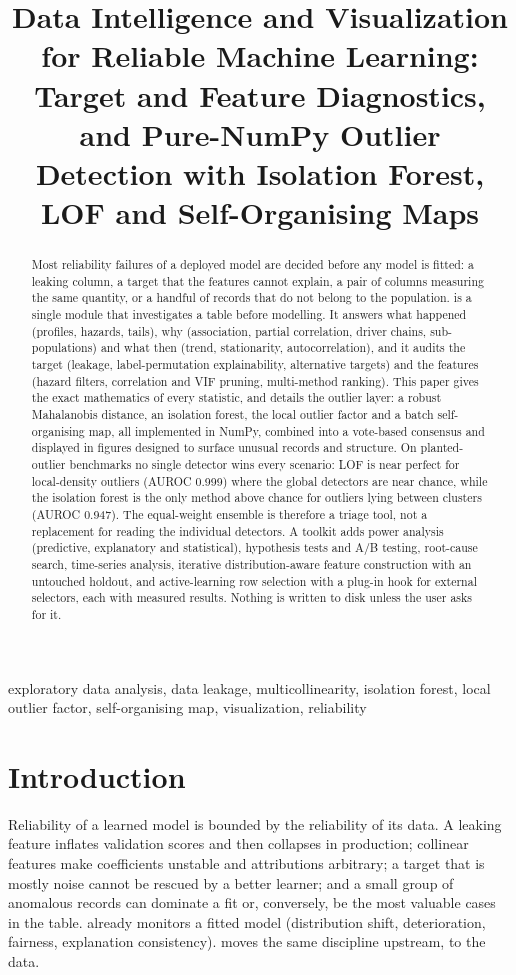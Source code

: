 \documentclass[conference]{IEEEtran}
\title{Data Intelligence and Visualization for Reliable Machine Learning: Target and Feature Diagnostics, and Pure-NumPy Outlier Detection with Isolation Forest, LOF and Self-Organising Maps}
\author{\jabulaniauthor
\and
\martinchanzauthor
\and
\oloratoauthor
\and
\mfundoauthor}
\begin{document}
\maketitle
\begin{abstract}
Most reliability failures of a deployed model are decided before any model is fitted: a leaking column, a target that the features cannot explain, a pair of columns measuring the same quantity, or a handful of records that do not belong to the population. \software{}  is a single module that investigates a table before modelling. It answers what happened (profiles, hazards, tails), why (association, partial correlation, driver chains, sub-populations) and what then (trend, stationarity, autocorrelation), and it audits the target (leakage, label-permutation explainability, alternative targets) and the features (hazard filters, correlation and VIF pruning, multi-method ranking). This paper gives the exact mathematics of every statistic, and details the outlier layer: a robust Mahalanobis distance, an isolation forest, the local outlier factor and a batch self-organising map, all implemented in NumPy, combined into a vote-based consensus and displayed in figures designed to surface unusual records and structure. On planted-outlier benchmarks no single detector wins every scenario: LOF is near perfect for local-density outliers (AUROC 0.999) where the global detectors are near chance, while the isolation forest is the only method above chance for outliers lying between clusters (AUROC 0.947). The equal-weight ensemble is therefore a triage tool, not a replacement for reading the individual detectors. A toolkit adds power analysis (predictive, explanatory and statistical), hypothesis tests and A/B testing, root-cause search, time-series analysis, iterative distribution-aware feature construction with an untouched holdout, and active-learning row selection with a plug-in hook for external selectors, each with measured results. Nothing is written to disk unless the user asks for it.
\end{abstract}
\begin{IEEEkeywords}
exploratory data analysis, data leakage, multicollinearity, isolation forest, local outlier factor, self-organising map, visualization, reliability
\end{IEEEkeywords}
\section{Introduction}
Reliability of a learned model is bounded by the reliability of its data. A leaking feature inflates validation scores and then collapses in production; collinear features make coefficients unstable and attributions arbitrary; a target that is mostly noise cannot be rescued by a better learner; and a small group of anomalous records can dominate a fit or, conversely, be the most valuable cases in the table. \software{} already monitors a fitted model (distribution shift, deterioration, fairness, explanation consistency).  moves the same discipline upstream, to the data.
\end{document}
